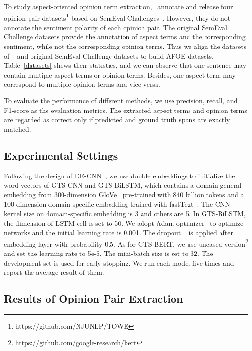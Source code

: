 \documentclass[11pt,a4paper]{article}
\begin{document}
To study aspect-oriented opinion term extraction,~ annotate and release four opinion pair datasets\footnote{https://github.com/NJUNLP/TOWE} based on SemEval Challenges~\cite{DBLP:conf/semeval/PontikiGPPAM14,DBLP:conf/semeval/PontikiGPMA15,DBLP:conf/semeval/PontikiGPAMAAZQ16}. However, they do not annotate the sentiment polarity of each opinion pair. The original SemEval Challenge datasets provide the annotation of aspect terms and the corresponding sentiment, while not the corresponding opinion terms. Thus we align the datasets of ~ and original SemEval Challenge datasets to build AFOE datasets. Table~\ref{datasets} shows their statistics, and we can observe that one sentence may contain multiple aspect terms or opinion terms. Besides, one aspect term may correspond to multiple opinion terms and vice versa.


To evaluate the performance of different methods, we use precision, recall, and F1-score as the evaluation metrics. The extracted aspect terms and opinion terms are regarded as correct only if predicted and ground truth spans are exactly matched.




\subsection{Experimental Settings}
Following the design of DE-CNN~\cite{DBLP:conf/acl/XuLSY18}, we use double embeddings to initialize the word vectors of GTS-CNN and GTS-BiLSTM, which contains a domain-general embedding from 300-dimension GloVe~\cite{DBLP:conf/emnlp/PenningtonSM14} pre-trained with 840 billion tokens and a 100-dimension domain-specific embedding trained with fastText~\cite{DBLP:journals/tacl/BojanowskiGJM17}. The CNN kernel size on domain-specific embedding is 3 and others are 5. In GTS-BiLSTM, the dimension of LSTM cell is set to 50. We adopt Adam optimizer~\cite{DBLP:journals/corr/KingmaB14} to optimize networks and the initial learning rate is 0.001. The dropout ~\cite{DBLP:journals/jmlr/SrivastavaHKSS14} is applied after embedding layer with probability 0.5. As for GTS-BERT, we use uncased  version\footnote{https://github.com/google-research/bert} and set the learning rate to 5e-5. The mini-batch size is set to 32. The development set is used for early stopping. We run each model five times and report the average result of them.


\subsection{Results of Opinion Pair Extraction}
\end{document}
